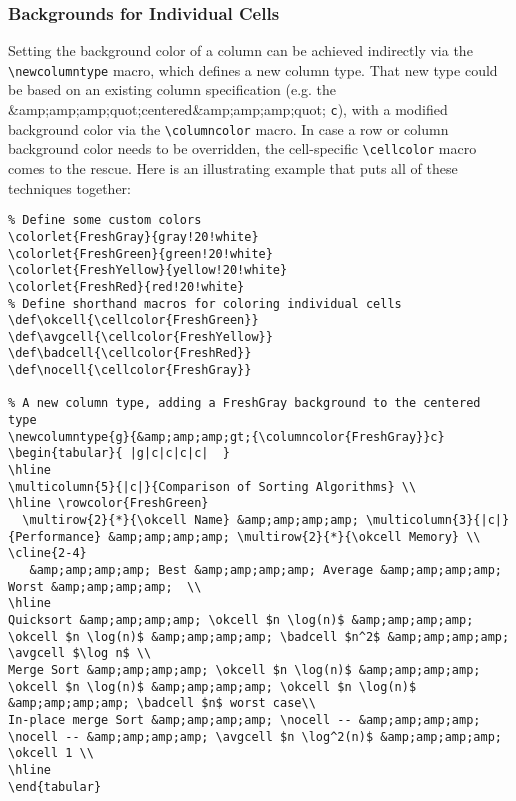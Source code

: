 \subsubsection{Backgrounds for Individual Cells}

Setting the background color of a column can be achieved indirectly via the \verb|\newcolumntype| macro, which defines a new column type. That new type could be based on an existing column specification (e.g. the &amp;amp;amp;quot;centered&amp;amp;amp;quot; \verb|c|), with a modified background color via the \verb|\columncolor| macro. In case a row or column background color needs to be overridden, the cell-specific \verb|\cellcolor| macro comes to the rescue. Here is an illustrating example that puts all of these techniques together:

\begin{lstlisting}
% Define some custom colors
\colorlet{FreshGray}{gray!20!white}
\colorlet{FreshGreen}{green!20!white}
\colorlet{FreshYellow}{yellow!20!white}
\colorlet{FreshRed}{red!20!white}
% Define shorthand macros for coloring individual cells
\def\okcell{\cellcolor{FreshGreen}}
\def\avgcell{\cellcolor{FreshYellow}}
\def\badcell{\cellcolor{FreshRed}}
\def\nocell{\cellcolor{FreshGray}}

% A new column type, adding a FreshGray background to the centered type
\newcolumntype{g}{&amp;amp;amp;gt;{\columncolor{FreshGray}}c}
\begin{tabular}{ |g|c|c|c|c|  }
\hline
\multicolumn{5}{|c|}{Comparison of Sorting Algorithms} \\
\hline \rowcolor{FreshGreen} 
  \multirow{2}{*}{\okcell Name} &amp;amp;amp;amp; \multicolumn{3}{|c|}{Performance} &amp;amp;amp;amp; \multirow{2}{*}{\okcell Memory} \\ \cline{2-4}
   &amp;amp;amp;amp; Best &amp;amp;amp;amp; Average &amp;amp;amp;amp; Worst &amp;amp;amp;amp;  \\
\hline
Quicksort &amp;amp;amp;amp; \okcell $n \log(n)$ &amp;amp;amp;amp; \okcell $n \log(n)$ &amp;amp;amp;amp; \badcell $n^2$ &amp;amp;amp;amp; \avgcell $\log n$ \\
Merge Sort &amp;amp;amp;amp; \okcell $n \log(n)$ &amp;amp;amp;amp; \okcell $n \log(n)$ &amp;amp;amp;amp; \okcell $n \log(n)$ &amp;amp;amp;amp; \badcell $n$ worst case\\
In-place merge Sort &amp;amp;amp;amp; \nocell -- &amp;amp;amp;amp; \nocell -- &amp;amp;amp;amp; \avgcell $n \log^2(n)$ &amp;amp;amp;amp; \okcell 1 \\
\hline
\end{tabular}
\end{lstlisting}

